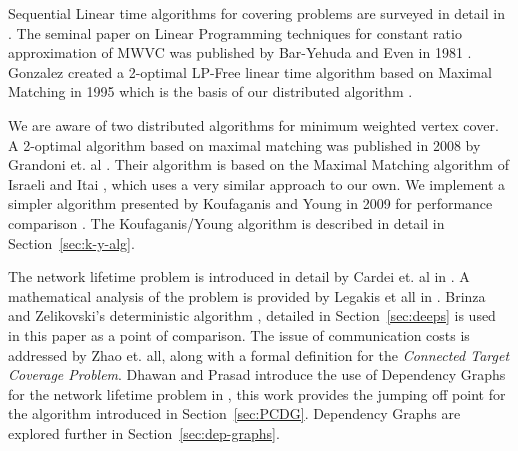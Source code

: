 
Sequential Linear time algorithms for covering problems are surveyed in detail in \cite{254190}. The seminal paper on Linear Programming techniques for constant ratio approximation of MWVC was published by Bar-Yehuda and Even in 1981 \cite{Bar-Yehuda:1981lr}. Gonzalez created a 2-optimal LP-Free linear time algorithm based on Maximal Matching in 1995 which is the basis of our distributed algorithm \cite{Gonzalez1995129}. 

We are aware of two distributed algorithms for minimum weighted vertex cover. A 2-optimal algorithm based on maximal matching was published in 2008 by Grandoni et. al \cite{1435381}. Their algorithm is based on the Maximal Matching algorithm of Israeli and Itai \cite{Israel:1986:FSR:5361.5365}, which uses a very similar approach to our own. We implement a simpler algorithm presented by Koufaganis and Young in 2009 for performance comparison \cite{1582746}. The Koufaganis/Young algorithm is described in detail in Section~\ref{sec:k-y-alg}.

The network lifetime problem is introduced in detail by Cardei et. al in \cite{1498475}. A mathematical analysis of the problem is provided by Legakis et all in \cite{4697802}. Brinza and Zelikovski's deterministic algorithm \cite{1640702}, detailed in Section~\ref{sec:deeps} is used in this paper as a point of comparison. The issue of communication costs is addressed by Zhao et. all, along with a formal definition for the {\em Connected Target Coverage Problem}\cite{1514028}. Dhawan and Prasad introduce the use of Dependency Graphs for the network lifetime problem in \cite{978-3-540-77220-0_36}, this work provides the jumping off point for the algorithm introduced in Section~\ref{sec:PCDG}. Dependency Graphs are explored further in Section~\ref{sec:dep-graphs}.
